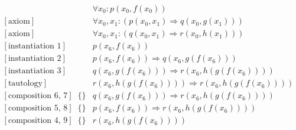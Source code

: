 \documentclass[onehalfspacing]{article}
\begin{document}
\setcounter{equation}{0}
\begin{align}
	[\text{axiom}] && \forall x_0: p(x_0,f(x_0))\\
	[\text{axiom}] && \forall x_0, x_1 : (p(x_0,x_1) \Rightarrow q(x_0,g(x_1)))\\
	[\text{axiom}] && \forall x_0, x_1 : (q(x_0,x_1) \Rightarrow r(x_0,h(x_1)))\\
	[\text{instantiation 1}] && p(x_6, f(x_6))\\
	[\text{instantiation 2}] && p(x_6, f(x_6))\Rightarrow q(x_6,g(f(x_6))) \\
	[\text{instantiation 3}] && q(x_6, g(f(x_6)))\Rightarrow r(x_6,h(g(f(x_6)))) \\
	[\text{tautology}] && r(x_6, h(g(f(x_6))))\Rightarrow r(x_6,h(g(f(x_6))))\\
	[\text{composition 6, 7}] &\{\}&q(x_6, g(f(x_6)))\Rightarrow r(x_6,h(g(f(x_6))))\\
	[\text{composition 5, 8}] &\{\}&p(x_6,f(x_6))\Rightarrow r(x_6, h(g(f(x_6))))\\
	[\text{composition 4, 9}] &\{\}&r(x_6, h(g(f(x_6))))
\end{align}
\end{document}
